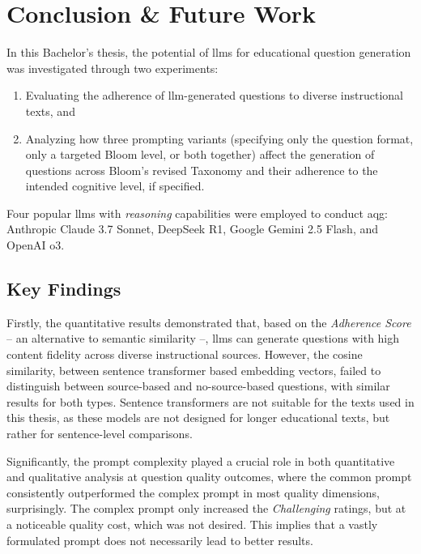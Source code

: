 \section{Conclusion \& Future Work} \label{sec:conclusion-and-future-work}

In this Bachelor's thesis, the potential of \acp{llm} for educational question generation was investigated through two experiments: 

\begin{enumerate}
  \item Evaluating the adherence of \ac{llm}-generated questions to diverse instructional texts, and
  \item Analyzing how three prompting variants (specifying only the question format, only a targeted Bloom level, or both together) affect the generation of questions across Bloom's revised Taxonomy and their adherence to the intended cognitive level, if specified.
\end{enumerate}

Four popular \acp{llm} with \textit{reasoning} capabilities were employed to conduct \ac{aqg}: Anthropic Claude 3.7 Sonnet, DeepSeek R1, Google Gemini 2.5 Flash, and OpenAI o3.

\subsection{Key Findings}

Firstly, the quantitative results demonstrated that, based on the \textit{Adherence Score} -- an alternative to semantic similarity --, \acp{llm} can generate questions with high content fidelity across diverse instructional sources. However, the cosine similarity, between sentence transformer based embedding vectors, failed to distinguish between source-based and no-source-based questions, with similar results for both types. Sentence transformers are not suitable for the texts used in this thesis, as these models are not designed for longer educational texts, but rather for sentence-level comparisons. 

Significantly, the prompt complexity played a crucial role in both quantitative and qualitative analysis at question quality outcomes, where the common prompt consistently outperformed the complex prompt in most quality dimensions, surprisingly. The complex prompt only increased the \textit{Challenging} ratings, but at a noticeable quality cost, which was not desired. This implies that a vastly formulated prompt does not necessarily lead to better results.

